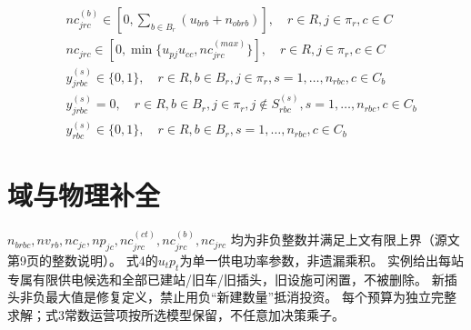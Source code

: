 \documentclass[11pt]{ctexart}
\begin{document}
\begin{align*}
& nc^{(b)}_{jrc} \in [0, \sum_{b \in B_r} (u_{brb} + n_{obrb})], \quad r \in R, j \in \pi_r, c \in C \tag{62} \\
& nc_{jrc} \in [0, \min\{u_{pj} u_{cc}, nc^{(max)}_{jrc}\}], \quad r \in R, j \in \pi_r, c \in C \tag{63} \\
& y^{(s)}_{jrbc} \in \{0, 1\}, \quad r \in R, b \in B_r, j \in \pi_r, s = 1, \dots, n_{rbc}, c \in C_b \tag{64} \\
& y^{(s)}_{jrbc} = 0, \quad r \in R, b \in B_r, j \in \pi_r, j \notin S^{(s)}_{rbc}, s = 1, \dots, n_{rbc}, c \in C_b \tag{65} \\
& y^{(s)}_{rbc} \in \{0, 1\}, \quad r \in R, b \in B_r, s = 1, \dots, n_{rbc}, c \in C_b \tag{66}
\end{align*}


\section*{域与物理补全}
$n_{brbc},nv_{rb},nc_{jc},np_{jc},nc^{(ct)}_{jrc},nc^{(b)}_{jrc},nc_{jrc}$
均为非负整数并满足上文有限上界（源文第9页的整数说明）。
式4的$u_tp_t$为单一供电功率参数，非遗漏乘积。
实例给出每站专属有限供电候选和全部已建站/旧车/旧插头，旧设施可闲置，不被删除。
新插头非负最大值是修复定义，禁止用负“新建数量”抵消投资。
每个预算为独立完整求解；式3常数运营项按所选模型保留，不任意加决策乘子。
\end{document}

